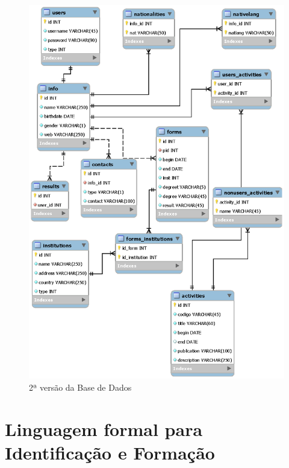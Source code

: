 \documentclass[a4paper,11pt,openright,openbib]{article}
\begin{document}
\begin{figure}[!ht]
\centering
\includegraphics[scale=1]{bd.eps}
\caption{2ª versão da Base de Dados}
\label{fig:basededados2}
\end{figure}
\section{Linguagem formal para Identificação e Formação}
\end{document}
